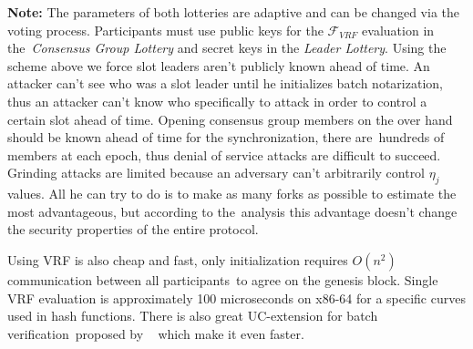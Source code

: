 \textbf{Note:} The parameters of both lotteries are adaptive and can be changed via the voting process.
Participants must use public keys for the ${\mathcal{F}}_{VRF}$ evaluation in the\
\textit{Consensus Group Lottery} and secret keys in the \textit{Leader Lottery}.
Using the scheme above we force slot leaders aren't publicly known ahead of time.
An attacker can't see who was a slot leader until he initializes batch notarization, thus an attacker can't know
who specifically to attack in order to control a certain slot ahead of time.
Opening consensus group members on the over hand should be known ahead of time for the synchronization, there are\
hundreds of members at each epoch, thus denial of service attacks are difficult to succeed.
Grinding attacks are limited because an adversary can't arbitrarily control $\eta_j$ values.
All he can try to do is to make as many forks as possible to estimate the most advantageous, but according to the\
analysis this advantage doesn't change the security properties of the entire protocol.

Using VRF is also cheap and fast, only initialization requires ${O(n^2)}$ communication between all participants\
to agree on the genesis block.
Single VRF evaluation is approximately 100 microseconds on x86-64 for a specific curves used in hash functions.
There is also great UC-extension for batch verification\
proposed by ~\cite{cryptoeprint:2022/1045} which make it even faster.